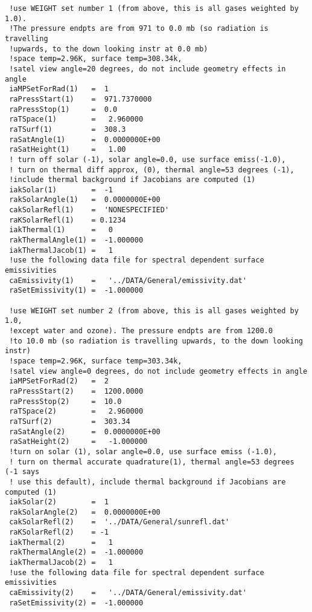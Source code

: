 \documentclass[12pt]{article}
\begin{document}
\begin{scriptsize}
\begin{verbatim}
 !use WEIGHT set number 1 (from above, this is all gases weighted by 1.0). 
 !The pressure endpts are from 971 to 0.0 mb (so radiation is travelling 
 !upwards, to the down looking instr at 0.0 mb)
 !space temp=2.96K, surface temp=308.34k, 
 !satel view angle=20 degrees, do not include geometry effects in angle
 iaMPSetForRad(1)   =  1
 raPressStart(1)    =  971.7370000
 raPressStop(1)     =  0.0
 raTSpace(1)        =   2.960000
 raTSurf(1)         =  308.3
 raSatAngle(1)      =  0.0000000E+00
 raSatHeight(1)     =   1.00
 ! turn off solar (-1), solar angle=0.0, use surface emiss(-1.0),
 ! turn on thermal diff approx, (0), thermal angle=53 degrees (-1),
 !include thermal background if Jacobians are computed (1)
 iakSolar(1)        =  -1
 rakSolarAngle(1)   =  0.0000000E+00
 cakSolarRefl(1)    =  'NONESPECIFIED'
 raKSolarRefl(1)    = 0.1234
 iakThermal(1)      =   0
 rakThermalAngle(1) =  -1.000000
 iakThermalJacob(1) =   1
 !use the following data file for spectral dependent surface emissivities
 caEmissivity(1)    =   '../DATA/General/emissivity.dat'
 raSetEmissivity(1) =  -1.000000

 !use WEIGHT set number 2 (from above, this is all gases weighted by 1.0, 
 !except water and ozone). The pressure endpts are from 1200.0
 !to 10.0 mb (so radiation is travelling upwards, to the down looking instr)
 !space temp=2.96K, surface temp=303.34k, 
 !satel view angle=0 degrees, do not include geometry effects in angle 
 iaMPSetForRad(2)   =  2
 raPressStart(2)    =  1200.0000
 raPressStop(2)     =  10.0
 raTSpace(2)        =   2.960000
 raTSurf(2)         =  303.34
 raSatAngle(2)      =  0.0000000E+00
 raSatHeight(2)     =   -1.000000
 !turn on solar (1), solar angle=0.0, use surface emiss (-1.0),
 ! turn on thermal accurate quadrature(1), thermal angle=53 degrees (-1 says 
 ! use this default), include thermal background if Jacobians are computed (1)
 iakSolar(2)        =  1
 rakSolarAngle(2)   =  0.0000000E+00
 cakSolarRefl(2)    =  '../DATA/General/sunrefl.dat'
 raKSolarRefl(2)    = -1
 iakThermal(2)      =   1
 rakThermalAngle(2) =  -1.000000
 iakThermalJacob(2) =   1
 !use the following data file for spectral dependent surface emissivities
 caEmissivity(2)    =   '../DATA/General/emissivity.dat'
 raSetEmissivity(2) =  -1.000000


\end{verbatim}
\end{scriptsize}
\end{document}
